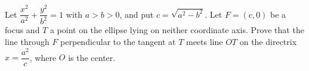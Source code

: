 Let $\dfrac{x^2}{a^2}+\dfrac{y^2}{b^2}=1$ with $a>b>0$, and put $c=\sqrt{a^2-b^2}$. Let $F=(c,0)$ be a focus and $T$ a point on the ellipse lying on neither coordinate axis. Prove that the line through $F$ perpendicular to the tangent at $T$ meets line $OT$ on the directrix $x=\dfrac{a^2}{c}$, where $O$ is the center.
